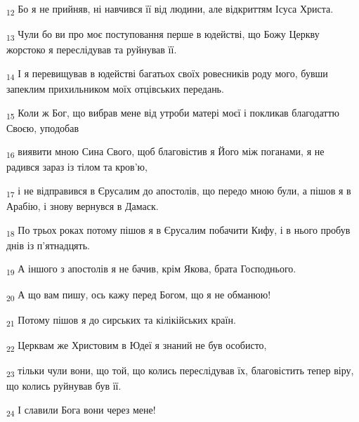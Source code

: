 \begin{tcolorbox}
\textsubscript{12} Бо я не прийняв, ні навчився її від людини, але відкриттям Ісуса Христа.
\end{tcolorbox}
\begin{tcolorbox}
\textsubscript{13} Чули бо ви про моє поступовання перше в юдействі, що Божу Церкву жорстоко я переслідував та руйнував її.
\end{tcolorbox}
\begin{tcolorbox}
\textsubscript{14} І я перевищував в юдействі багатьох своїх ровесників роду мого, бувши запеклим прихильником моїх отцівських передань.
\end{tcolorbox}
\begin{tcolorbox}
\textsubscript{15} Коли ж Бог, що вибрав мене від утроби матері моєї і покликав благодаттю Своєю, уподобав
\end{tcolorbox}
\begin{tcolorbox}
\textsubscript{16} виявити мною Сина Свого, щоб благовістив я Його між поганами, я не радився зараз із тілом та кров'ю,
\end{tcolorbox}
\begin{tcolorbox}
\textsubscript{17} і не відправився в Єрусалим до апостолів, що передо мною були, а пішов я в Арабію, і знову вернувся в Дамаск.
\end{tcolorbox}
\begin{tcolorbox}
\textsubscript{18} По трьох роках потому пішов я в Єрусалим побачити Кифу, і в нього пробув днів із п'ятнадцять.
\end{tcolorbox}
\begin{tcolorbox}
\textsubscript{19} А іншого з апостолів я не бачив, крім Якова, брата Господнього.
\end{tcolorbox}
\begin{tcolorbox}
\textsubscript{20} А що вам пишу, ось кажу перед Богом, що я не обманюю!
\end{tcolorbox}
\begin{tcolorbox}
\textsubscript{21} Потому пішов я до сирських та кілікійських країн.
\end{tcolorbox}
\begin{tcolorbox}
\textsubscript{22} Церквам же Христовим в Юдеї я знаний не був особисто,
\end{tcolorbox}
\begin{tcolorbox}
\textsubscript{23} тільки чули вони, що той, що колись переслідував їх, благовістить тепер віру, що колись руйнував був її.
\end{tcolorbox}
\begin{tcolorbox}
\textsubscript{24} І славили Бога вони через мене!
\end{tcolorbox}

